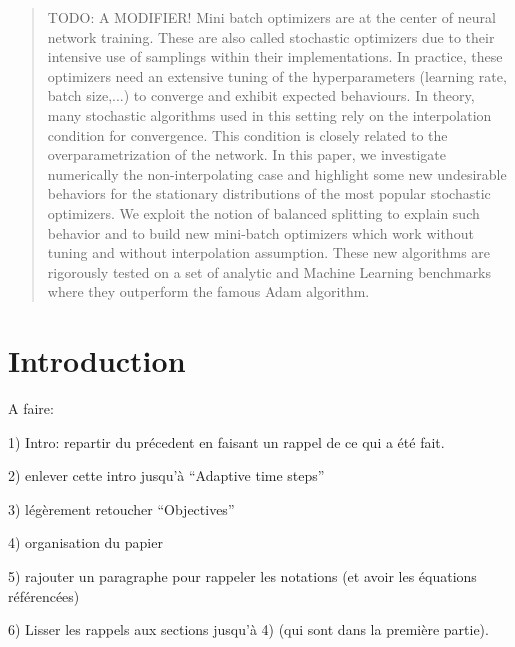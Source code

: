 \begin{abstract}
  TODO: A MODIFIER!
	Mini batch optimizers are at the center of neural network training. 
        These are also called stochastic optimizers due to their intensive use of samplings within their implementations. 
        In practice, these optimizers need an extensive tuning of the hyperparameters (learning rate, batch size,...) to converge and exhibit expected behaviours. %
        In theory, many stochastic algorithms used in this setting rely on the interpolation condition for convergence. 
        This condition is closely related to the overparametrization of the network. 
        In this paper, we investigate numerically the non-interpolating case and highlight some new undesirable behaviors for the stationary distributions of the most popular stochastic optimizers. 
        We exploit the notion of balanced splitting to explain such behavior and to build new mini-batch optimizers which work without tuning and without interpolation assumption. 
        These new algorithms are rigorously tested on a set of analytic and Machine Learning benchmarks where they outperform the famous Adam algorithm.
\end{abstract}

\section{Introduction}
\label{intro}

A faire:

 1) Intro: repartir du précedent en faisant un rappel de ce qui a été fait.

 2) enlever cette intro jusqu'à ``Adaptive time steps''

 3) légèrement retoucher ``Objectives''

 4) organisation du papier

 5) rajouter un paragraphe pour rappeler les notations (et avoir les équations référencées)

 6) Lisser les rappels aux sections jusqu'à 4) (qui sont dans la première partie).
 
